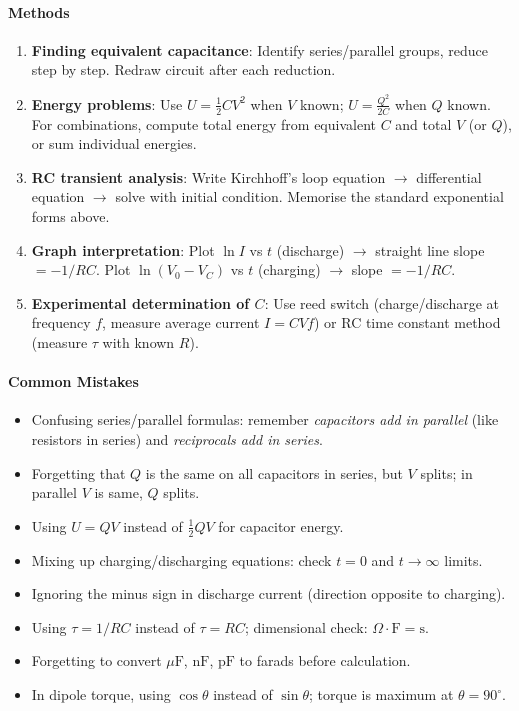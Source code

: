 \documentclass[11pt]{article}
\begin{document}
\begin{bilan}
\paragraph{Methods}
\begin{enumerate}
  \item \textbf{Finding equivalent capacitance}: Identify series/parallel groups, reduce step by step. Redraw circuit after each reduction.
  \item \textbf{Energy problems}: Use $U = \frac{1}{2}CV^2$ when $V$ known; $U = \frac{Q^2}{2C}$ when $Q$ known. For combinations, compute total energy from equivalent $C$ and total $V$ (or $Q$), or sum individual energies.
  \item \textbf{RC transient analysis}: Write Kirchhoff's loop equation $\to$ differential equation $\to$ solve with initial condition. Memorise the standard exponential forms above.
  \item \textbf{Graph interpretation}: Plot $\ln I$ vs $t$ (discharge) $\to$ straight line slope $=-1/RC$. Plot $\ln(V_0-V_C)$ vs $t$ (charging) $\to$ slope $=-1/RC$.
  \item \textbf{Experimental determination of $C$}: Use reed switch (charge/discharge at frequency $f$, measure average current $I = C V f$) or RC time constant method (measure $\tau$ with known $R$).
\end{enumerate}

\paragraph{Common Mistakes}
\begin{itemize}
  \item Confusing series/parallel formulas: remember \emph{capacitors add in parallel} (like resistors in series) and \emph{reciprocals add in series}.
  \item Forgetting that $Q$ is the same on all capacitors in series, but $V$ splits; in parallel $V$ is same, $Q$ splits.
  \item Using $U = QV$ instead of $\frac{1}{2}QV$ for capacitor energy.
  \item Mixing up charging/discharging equations: check $t=0$ and $t\to\infty$ limits.
  \item Ignoring the minus sign in discharge current (direction opposite to charging).
  \item Using $\tau = 1/RC$ instead of $\tau = RC$; dimensional check: $\Omega \cdot \mathrm{F} = \mathrm{s}$.
  \item Forgetting to convert $\mu\mathrm{F}$, $\mathrm{nF}$, $\mathrm{pF}$ to farads before calculation.
  \item In dipole torque, using $\cos\theta$ instead of $\sin\theta$; torque is maximum at $\theta=90^\circ$.
\end{itemize}


\end{bilan}
\end{document}
